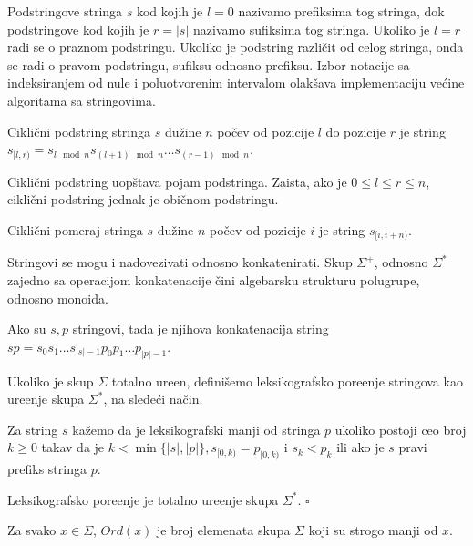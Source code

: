 Podstringove stringa $s$ kod kojih je $l=0$ nazivamo prefiksima tog stringa, dok podstringove kod kojih je $r=|s|$ nazivamo sufiksima tog stringa. Ukoliko je $l=r$ radi se o praznom podstringu. Ukoliko je podstring razli\v cit od celog stringa, onda se radi o pravom podstringu, sufiksu odnosno prefiksu. Izbor notacije sa indeksiranjem od nule i poluotvorenim intervalom olak\v sava implementaciju ve\' cine algoritama sa stringovima.

\begin{dfn}
Cikli\v cni podstring stringa $s$ du\v zine $n$ po\v cev od pozicije $l$ do pozicije $r$ je string $s_{[l, r)} = s_{l \mod n}s_{(l+1)\mod n}\ldots s_{(r-1)\mod n}$.
\end{dfn}

Cikli\v cni podstring uop\v stava pojam podstringa. Zaista, ako je $0 \leq l \leq r \leq n$, cikli\v cni podstring jednak je obi\v cnom podstringu.

\begin{dfn}
Cikli\v cni pomeraj stringa $s$ du\v zine $n$ po\v cev od pozicije $i$ je string $s_{[i, i+n)}$.
\end{dfn}

Stringovi se mogu i nadovezivati odnosno konkatenirati. Skup $\Sigma^+$, odnosno $\Sigma^*$ zajedno sa operacijom konkatenacije \v cini algebarsku strukturu polugrupe, odnosno monoida.

\begin{dfn}
Ako su $s,p$ stringovi, tada je njihova konkatenacija string $sp = s_0s_1\ldots s_{|s|-1}p_0p_1\ldots p_{|p|-1}$.
\end{dfn}



Ukoliko je skup $\Sigma$ totalno ure\dj en, defini\v semo leksikografsko pore\dj enje stringova kao ure\dj enje skupa $\Sigma^*$, na slede\' ci na\v cin.

\begin{dfn}
Za string $s$ ka\v zemo da je leksikografski manji od stringa $p$ ukoliko postoji ceo broj $k \geq 0$ takav da je $k < \min \{|s|, |p|\}, s_{[0, k)} = p_{[0, k)}$ i $s_k < p_k$ ili ako je $s$ pravi prefiks stringa $p$.
\end{dfn}

\begin{thm}
Leksikografsko pore\dj enje je totalno ure\dj enje skupa $\Sigma^*$. \hfill $\square$
\end{thm}

\begin{dfn}
Za svako $x \in \Sigma$, $Ord(x)$ je broj elemenata skupa $\Sigma$ koji su strogo manji od $x$.
\end{dfn}
 
